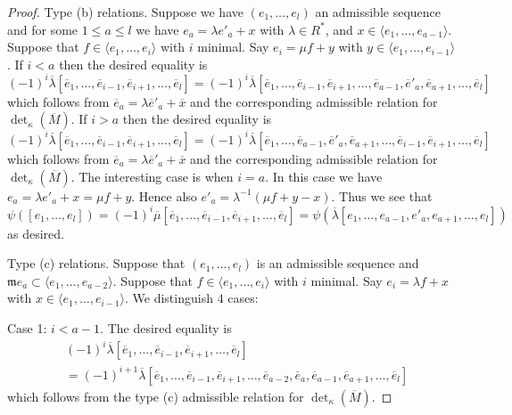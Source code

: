 \documentclass[10pt,a4paper]{amsart}
\theoremstyle{plain}
\theoremstyle{definition}
\theoremstyle{remark}
\numberwithin{equation}{subsection}
\begin{document}
\begin{proof}
\medskip\noindent
Type (b) relations. Suppose we have $(e_1, \ldots, e_l)$ an
admissible sequence and for some $1 \leq a \leq l$ we have
$e_a = \lambda e'_a + x$ with $\lambda \in R^*$, and
$x \in \langle e_1, \ldots, e_{a - 1}\rangle$.
Suppose that $f \in \langle e_1, \ldots, e_i\rangle$ with $i$ minimal.
Say $e_i = \mu f + y$ with $y \in \langle e_1, \ldots, e_{i - 1}\rangle$.
If $i < a$ then the desired equality is
$$
(-1)^i
\overline{\lambda}
[\overline{e}_1,
\ldots,
\overline{e}_{i - 1},
\overline{e}_{i + 1},
\ldots,
\overline{e}_l]
=
(-1)^i
\overline{\lambda}
[\overline{e}_1,
\ldots,
\overline{e}_{i - 1},
\overline{e}_{i + 1},
\ldots,
\overline{e}_{a - 1},
\overline{e}'_a,
\overline{e}_{a + 1},
\ldots,
\overline{e}_l]
$$
which follows from $\overline{e}_a = \lambda \overline{e}'_a + \overline{x}$
and the corresponding admissible relation for $\det_\kappa(\overline{M})$.
If $i > a$ then the desired equality is
$$
(-1)^i
\overline{\lambda}
[\overline{e}_1,
\ldots,
\overline{e}_{i - 1},
\overline{e}_{i + 1},
\ldots,
\overline{e}_l]
=
(-1)^i
\overline{\lambda}
[\overline{e}_1,
\ldots,
\overline{e}_{a - 1},
\overline{e}'_a,
\overline{e}_{a + 1},
\ldots,
\overline{e}_{i - 1},
\overline{e}_{i + 1},
\ldots,
\overline{e}_l]
$$
which follows from $\overline{e}_a = \lambda \overline{e}'_a + \overline{x}$
and the corresponding admissible relation for $\det_\kappa(\overline{M})$.
The interesting case is when $i = a$. In this case we have
$e_a = \lambda e'_a + x = \mu f + y$. Hence also
$e'_a = \lambda^{-1}(\mu f + y - x)$. Thus we see that
$$
\psi([e_1, \ldots, e_l])
= (-1)^i \overline{\mu}
[\overline{e}_1, \ldots,
\overline{e}_{i - 1},
\overline{e}_{i + 1}, \ldots, \overline{e}_l]
=
\psi(
\overline{\lambda}
[e_1, \ldots, e_{a - 1}, e'_a, e_{a + 1}, \ldots, e_l]
)
$$
as desired.

\medskip\noindent
Type (c) relations. Suppose that $(e_1, \ldots, e_l)$
is an admissible sequence and
$\mathfrak m e_a \subset \langle e_1, \ldots, e_{a - 2}\rangle$.
Suppose that $f \in \langle e_1, \ldots, e_i\rangle$ with $i$ minimal.
Say $e_i = \lambda f + x$ with $x \in \langle e_1, \ldots, e_{i - 1}\rangle$.
We distinguish $4$ cases:

\medskip\noindent
Case 1: $i < a - 1$. The desired equality is
\begin{align*}
& (-1)^i
\overline{\lambda}
[\overline{e}_1,
\ldots,
\overline{e}_{i - 1},
\overline{e}_{i + 1},
\ldots,
\overline{e}_l] \\
& =
(-1)^{i + 1}
\overline{\lambda}
[\overline{e}_1,
\ldots,
\overline{e}_{i - 1},
\overline{e}_{i + 1},
\ldots,
\overline{e}_{a - 2},
\overline{e}_a,
\overline{e}_{a - 1},
\overline{e}_{a + 1},
\ldots,
\overline{e}_l]
\end{align*}
which follows from the type (c) admissible relation for
$\det_\kappa(\overline{M})$.


\end{proof}
\end{document}
